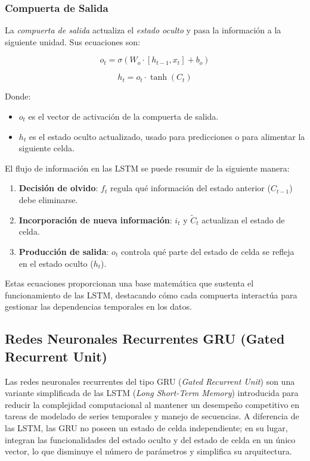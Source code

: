 \subsubsection{Compuerta de Salida}

La \textit{compuerta de salida} actualiza el \textit{estado oculto} y pasa la información a la siguiente unidad. Sus ecuaciones son:

\begin{equation}
    o_t = \sigma(W_o \cdot [h_{t-1}, x_t] + b_o)
\end{equation}

\begin{equation}
    h_t = o_t \cdot \tanh(C_t)
\end{equation}

Donde:  
\begin{itemize}
    \item \(o_t\) es el vector de activación de la compuerta de salida.  
    \item \(h_t\) es el estado oculto actualizado, usado para predicciones o para alimentar la siguiente celda.
\end{itemize}

El flujo de información en las LSTM se puede resumir de la siguiente manera:  
\begin{enumerate}
    \item \textbf{Decisión de olvido}: \(f_t\) regula qué información del estado anterior (\(C_{t-1}\)) debe eliminarse.  
    \item \textbf{Incorporación de nueva información}: \(i_t\) y \(\tilde{C}_t\) actualizan el estado de celda.  
    \item \textbf{Producción de salida}: \(o_t\) controla qué parte del estado de celda se refleja en el estado oculto (\(h_t\)).
\end{enumerate}

Estas ecuaciones proporcionan una base matemática que sustenta el funcionamiento de las LSTM, destacando cómo cada compuerta interactúa para gestionar las dependencias temporales en los datos.

\subsection{Redes Neuronales Recurrentes GRU (Gated Recurrent Unit)}

Las redes neuronales recurrentes del tipo GRU (\textit{Gated Recurrent Unit}) son una variante simplificada de las LSTM (\textit{Long Short-Term Memory}) introducida para reducir la complejidad computacional al mantener un desempeño competitivo en tareas de modelado de series temporales y manejo de secuencias. A diferencia de las LSTM, las GRU no poseen un estado de celda independiente; en su lugar, integran las funcionalidades del estado oculto y del estado de celda en un único vector, lo que disminuye el número de parámetros y simplifica su arquitectura.

